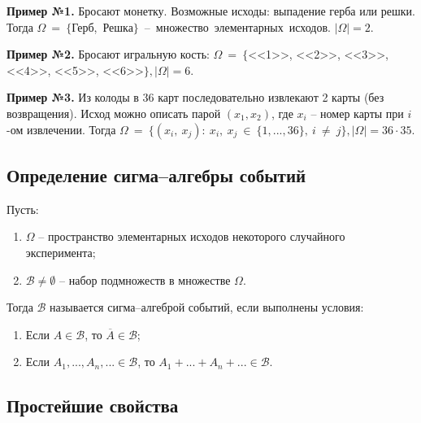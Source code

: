 \textbf{Пример №1.} Бросают монетку. Возможные исходы: выпадение герба или решки. Тогда $\Omega~=~\{$Герб,~Решка$\}$~--~множество~элементарных~исходов. $|\Omega| = 2$.

\textbf{Пример №2.} Бросают игральную кость: $\Omega~=~\{$<<1>>, <<2>>, <<3>>, <<4>>, <<5>>, <<6>>$\}, |\Omega| = 6.$

\textbf{Пример №3.} Из колоды в 36 карт последовательно извлекают 2 карты (без возвращения). Исход можно описать парой $(x_1, x_2)$, где $x_i$ -- номер карты при $i$-ом извлечении. Тогда $\Omega~=~\{(x_i,~x_j):~x_i,~x_j~\in~\{1, ..., 36\},~i~\neq~j\}, |\Omega| = 36 \cdot 35.$ 

\subsection*{Определение сигма--алгебры событий}

Пусть:
\begin{enumerate}[label=\arabic*)]
	\item $\Omega$ -- пространство элементарных исходов некоторого случайного эксперимента;
	\item $\mathcal{B} \neq \emptyset$ -- набор подмножеств в множестве $\Omega$.
\end{enumerate}

Тогда $\mathcal{B}$ называется сигма--алгеброй событий, если выполнены условия:

\begin{enumerate}[label=\arabic*)]
	\item Если $A \in \mathcal{B}$, то $\overline{A} \in \mathcal{B}$;
	\item Если $A_1, ..., A_n, ... \in \mathcal{B}$, то $A_1 + ... + A_n + ... \in \mathcal{B}$.
\end{enumerate}

\subsection*{Простейшие свойства}

